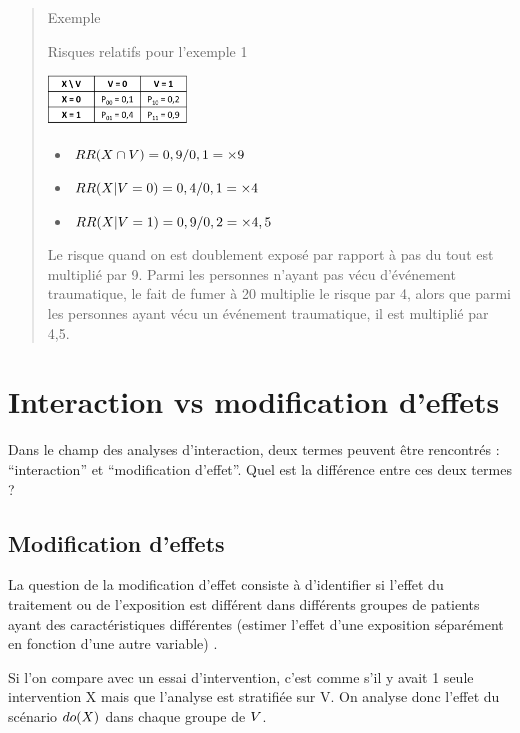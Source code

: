 \documentclass[
]{book}
\providecommand{\tightlist}{%
  \setlength{\itemsep}{0pt}\setlength{\parskip}{0pt}}
\begin{document}
\begin{quote}
Exemple

Risques relatifs pour l'exemple 1

\includegraphics[width=0.3\textwidth,height=\textheight]{img/Image1.png}

\begin{itemize}
\tightlist
\item
  \(\small RR(X \cap V) = 0,9/0,1 = \times 9\)
\item
  \(\small RR(X | V=0) = 0,4/0,1 = \times 4\)
\item
  \(\small RR(X | V=1) = 0,9/0,2 = \times 4,5\)
\end{itemize}

Le risque quand on est doublement exposé par rapport à pas du tout est multiplié par 9. Parmi les personnes n'ayant pas vécu d'événement traumatique, le fait de fumer à 20 multiplie le risque par 4, alors que parmi les personnes ayant vécu un événement traumatique, il est multiplié par 4,5.
\end{quote}

\hypertarget{intmodif}{%
\chapter{Interaction vs modification d'effets}\label{intmodif}}

Dans le champ des analyses d'interaction, deux termes peuvent être rencontrés : ``interaction'' et ``modification d'effet''. Quel est la différence entre ces deux termes ?

\hypertarget{modification-deffets}{%
\section{Modification d'effets}\label{modification-deffets}}

La question de la modification d'effet consiste à d'identifier si l'effet du traitement ou de l'exposition est différent dans différents groupes de patients ayant des caractéristiques différentes (estimer l'effet d'une exposition séparément en fonction d'une autre variable) \citet{corraini_effect_2017}.

Si l'on compare avec un essai d'intervention, c'est comme s'il y avait 1 seule intervention X mais que l'analyse est stratifiée sur V. On analyse donc l'effet du scénario \(\small do(X)\) dans chaque groupe de \(\small V\).
\end{document}
